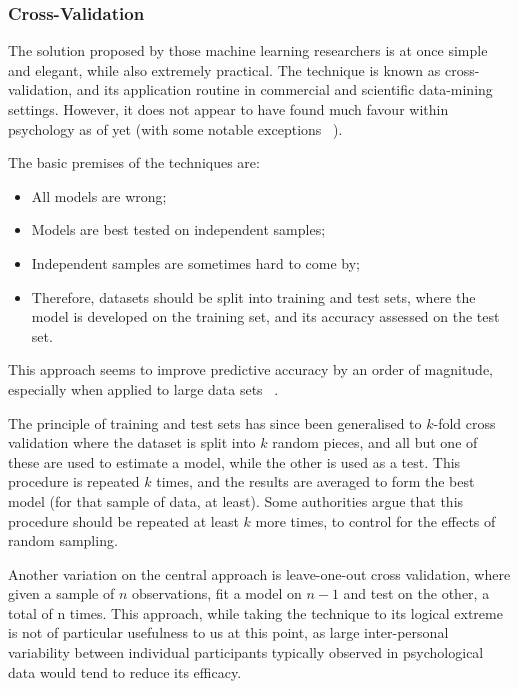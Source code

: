 \subsubsection{Cross-Validation}

The solution proposed by those machine learning researchers is at once simple and elegant, while also extremely practical. The technique is known as cross-validation, and its application routine in commercial and scientific data-mining settings. However, it does not appear to have found much favour within psychology as of yet (with some notable exceptions ~\cite{dawes1979robust}).

The basic premises of the techniques are:
\begin{itemize}
\item All models are wrong;
\item Models are best tested on independent samples;
\item Independent samples are sometimes hard to come by;
\item Therefore, datasets should be split into training and test sets, where the model is developed on the training set, and its accuracy assessed on the test set.
\end{itemize}

This approach seems to improve predictive accuracy by an order of  magnitude, especially when applied to large data sets ~\cite{breiman2001statistical}.  

The principle of training and test sets has since been generalised to $k$-fold cross validation where the dataset is split into $k$ random pieces, and all but one of these are used to estimate a model, while the other is used as a test. This procedure is repeated $k$ times, and the results are averaged to form the best model (for that sample of data, at least). Some authorities argue that this procedure should be repeated at least $k$ more times, to control for the effects of random sampling\cite{friedman2009elements}.

Another variation on the central approach is leave-one-out cross validation, where given a sample of $n$ observations, fit a model on $n-1$ and test on the other, a total of n times. This approach, while taking the technique to its logical extreme is not of particular usefulness to us at this point, as large inter-personal variability between individual participants typically observed in psychological data would tend to reduce its efficacy\cite{friedman2009elements}. %

